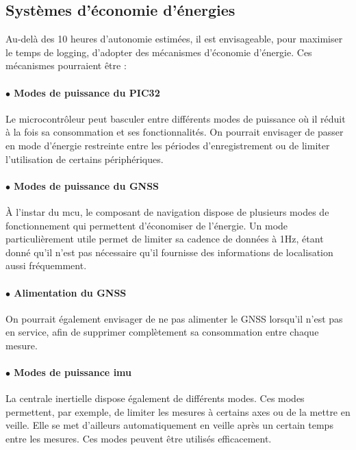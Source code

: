 \clearpage

\subsection{Systèmes d'économie d'énergies} 

Au-delà des 10 heures d'autonomie estimées, il est envisageable, pour maximiser le temps de logging, d'adopter des mécanismes d'économie d'énergie. Ces mécanismes pourraient être :

\paragraph{$\bullet$ Modes de puissance du PIC32} Le microcontrôleur peut basculer entre différents modes de puissance où il réduit à la fois sa consommation et ses fonctionnalités. On pourrait envisager de passer en mode d'énergie restreinte entre les périodes d'enregistrement ou de limiter l'utilisation de certains périphériques.

\paragraph{$\bullet$ Modes de puissance du \gls{GNSS}} À l'instar du \gls{mcu}, le composant de navigation dispose de plusieurs modes de fonctionnement qui permettent d'économiser de l'énergie. Un mode particulièrement utile permet de limiter sa cadence de données à 1Hz, étant donné qu'il n'est pas nécessaire qu'il fournisse des informations de localisation aussi fréquemment.

\paragraph{$\bullet$ Alimentation du \gls{GNSS}} On pourrait également envisager de ne pas alimenter le \gls{GNSS} lorsqu'il n'est pas en service, afin de supprimer complètement sa consommation entre chaque mesure.

\paragraph{$\bullet$ Modes de puissance \gls{imu}} La centrale inertielle dispose également de différents modes. Ces modes permettent, par exemple, de limiter les mesures à certains axes ou de la mettre en veille. Elle se met d'ailleurs automatiquement en veille après un certain temps entre les mesures. Ces modes peuvent être utilisés efficacement.

